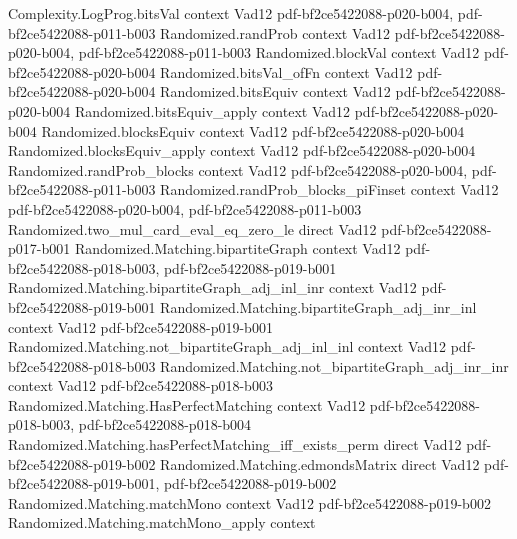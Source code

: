 \begin{theorem}
\label{Randomized.Matching.lovasz_test_exact}
\leanok
\proofstep
  {Complexity.LogProg.bitsVal}
  {context}
  {Vad12}
  {pdf-bf2ce5422088-p020-b004,
    pdf-bf2ce5422088-p011-b003}
\proofstep
  {Randomized.randProb}
  {context}
  {Vad12}
  {pdf-bf2ce5422088-p020-b004,
    pdf-bf2ce5422088-p011-b003}
\proofstep
  {Randomized.blockVal}
  {context}
  {Vad12}
  {pdf-bf2ce5422088-p020-b004}
\proofstep
  {Randomized.bitsVal_ofFn}
  {context}
  {Vad12}
  {pdf-bf2ce5422088-p020-b004}
\proofstep
  {Randomized.bitsEquiv}
  {context}
  {Vad12}
  {pdf-bf2ce5422088-p020-b004}
\proofstep
  {Randomized.bitsEquiv_apply}
  {context}
  {Vad12}
  {pdf-bf2ce5422088-p020-b004}
\proofstep
  {Randomized.blocksEquiv}
  {context}
  {Vad12}
  {pdf-bf2ce5422088-p020-b004}
\proofstep
  {Randomized.blocksEquiv_apply}
  {context}
  {Vad12}
  {pdf-bf2ce5422088-p020-b004}
\proofstep
  {Randomized.randProb_blocks}
  {context}
  {Vad12}
  {pdf-bf2ce5422088-p020-b004,
    pdf-bf2ce5422088-p011-b003}
\proofstep
  {Randomized.randProb_blocks_piFinset}
  {context}
  {Vad12}
  {pdf-bf2ce5422088-p020-b004,
    pdf-bf2ce5422088-p011-b003}
\proofstep
  {Randomized.two_mul_card_eval_eq_zero_le}
  {direct}
  {Vad12}
  {pdf-bf2ce5422088-p017-b001}
\proofstep
  {Randomized.Matching.bipartiteGraph}
  {context}
  {Vad12}
  {pdf-bf2ce5422088-p018-b003,
    pdf-bf2ce5422088-p019-b001}
\proofstep
  {Randomized.Matching.bipartiteGraph_adj_inl_inr}
  {context}
  {Vad12}
  {pdf-bf2ce5422088-p019-b001}
\proofstep
  {Randomized.Matching.bipartiteGraph_adj_inr_inl}
  {context}
  {Vad12}
  {pdf-bf2ce5422088-p019-b001}
\proofstep
  {Randomized.Matching.not_bipartiteGraph_adj_inl_inl}
  {context}
  {Vad12}
  {pdf-bf2ce5422088-p018-b003}
\proofstep
  {Randomized.Matching.not_bipartiteGraph_adj_inr_inr}
  {context}
  {Vad12}
  {pdf-bf2ce5422088-p018-b003}
\proofstep
  {Randomized.Matching.HasPerfectMatching}
  {context}
  {Vad12}
  {pdf-bf2ce5422088-p018-b003,
    pdf-bf2ce5422088-p018-b004}
\proofstep
  {Randomized.Matching.hasPerfectMatching_iff_exists_perm}
  {direct}
  {Vad12}
  {pdf-bf2ce5422088-p019-b002}
\proofstep
  {Randomized.Matching.edmondsMatrix}
  {direct}
  {Vad12}
  {pdf-bf2ce5422088-p019-b001,
    pdf-bf2ce5422088-p019-b002}
\proofstep
  {Randomized.Matching.matchMono}
  {context}
  {Vad12}
  {pdf-bf2ce5422088-p019-b002}
\proofstep
  {Randomized.Matching.matchMono_apply}
  {context}

\end{theorem}
